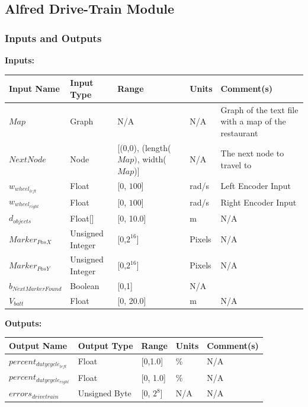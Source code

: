 \documentclass [10pt]{article}
\begin{document}

\subsection{Alfred Drive-Train Module}


\subsubsection{Inputs and Outputs}

\textbf{Inputs: } \\

\begin{longtable}{| p{} | p{} | p{} | p{} | p{} |}\hline 
	\rowcolor{tableCell}\textbf{Input Name} & \textbf{Input Type} & \textbf{Range} & \textbf{Units} & \textbf{Comment(s)} \\ \hline
	$ Map $ & Graph & N/A & N/A & Graph of the text file with a map of the restaurant \\ \hline
	\rowcolor{tableCell}$ NextNode $ & Node & [(0,0), (length($Map)$, width($Map$)] & N/A & The next node to travel to \\ \hline
	$ w_{wheel_{left}} $ & Float & [0, $ 100 $]& rad/s &  Left Encoder Input\\ \hline
	\rowcolor{tableCell}$ w_{wheel_{right}} $ & Float & [0, $ 100 $]& rad/s & Right Encoder Input \\ \hline
	$  d_{objects} $ & Float[] & [0, 10.0]& m &  N/A\\ \hline
	\rowcolor{tableCell}$ Marker_{PosX} $ & Unsigned Integer & [0,$2^{16}$] & Pixels &  N/A\\ \hline
	$ Marker_{PosY} $ & Unsigned Integer & [0,$2^{16}$] & Pixels & N/A\\ \hline
	\rowcolor{tableCell}$ b_{NextMarkerFound} $ & Boolean & [0,1] & N/A & \\ \hline
	$  V_{batt} $ & Float & [0, 20.0]& m &  N/A\\ \hline
\end{longtable}


\textbf{Outputs: } \\
\begin{longtable}{|l|l|l|l|l|}\hline 
	\rowcolor{tableCell}\textbf{Output Name} & \textbf{Output Type} & \textbf{Range} & \textbf{Units} & \textbf{Comment(s)} \\ \hline
	$ percent_{dutycycle_{left}} $ & Float & [0,1.0] & \% &  N/A\\ \hline
	\rowcolor{tableCell}$ percent_{dutycycle_{right}} $ & Float & [0, 1.0]& \% & N/A\\ \hline
	$ errors_{drivetrain} $ & Unsigned Byte & [0, $2^{8}$]& N/A & N/A\\ \hline
\end{longtable}
\end{document}
